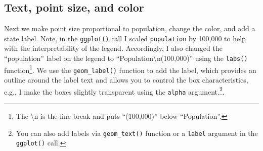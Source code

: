 \documentclass[12pt,oneside]{book}\usepackage[]{graphicx}\usepackage[]{color}
\begin{document}
\subsection{Text, point size, and color}
Next we make point size proportional to population, change the color, and add a state label. Note, in the \verb+ggplot()+ call I scaled \verb+population+ by 100,000 to help with the interpretability of the legend. Accordingly, I also changed the ``population'' label on the legend to ``Population\textbackslash n(100,000)'' using the \verb+labs()+ function\footnote{The \textbackslash n is the line break and puts ``(100,000)'' below ``Population''.}. We use the \verb+geom_label()+ function to add the label, which provides an outline around the label text and allows you to control the box characteristics, e.g., I make the boxes slightly transparent using the \verb+alpha+ argument.\footnote{You can also add labels via \texttt{geom\_text()} function or a \texttt{label} argument in the \texttt{ggplot()} call.}. 
\end{document}
